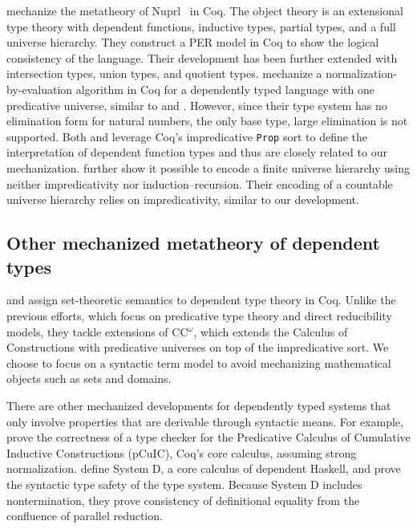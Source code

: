 \documentclass[\ifpublic nolinenum\else\fi,online,OA]{jfp}
\newcommand{\jc}[1]{}
\theoremstyle{definition}
\begin{document}
\citet{anand2014towards} mechanize the metatheory of
Nuprl~\citep{constable1986implementing} in Coq. The object theory is an
extensional type theory with dependent functions, inductive types,
partial types, and a full universe hierarchy. They construct a PER
model in Coq to show the logical consistency of the language. Their
development has been further extended with intersection types,
union types, and quotient types.
\citet{nbeincoq} mechanize a normalization-by-evaluation algorithm in Coq for a
dependently typed language with one predicative universe, similar to
\citet{decagda} and \citet{martin-lof-a-la-coq}. However, since their
type system has no elimination form for natural numbers, the only base type,
large elimination is not supported.
Both \citet{anand2014towards} and \citet{nbeincoq} leverage
Coq's impredicative \texttt{Prop} sort to define the interpretation
of dependent function types and thus are closely related to our
mechanization. \citet{anand2014towards} further show it possible
to encode a finite universe hierarchy using neither impredicativity
nor induction--recursion. Their encoding of a countable
universe hierarchy relies on impredicativity, similar to our
development.
\jc{Wait I'm confused, do they use impredicativity or not?}

\subsection{Other mechanized metatheory of dependent types}

 and \citet{Wang2013SemanticsOI} assign
set-theoretic semantics to dependent type theory in Coq. Unlike the
previous efforts, which focus on predicative type theory and direct
reducibility models, they tackle extensions of
CC$^\omega$, which extends the Calculus of Constructions with predicative
universes on top of the impredicative sort. We choose to
focus on a syntactic term model to avoid mechanizing mathematical objects
such as sets and domains.

There are other mechanized developments for dependently typed systems that
only involve properties that are derivable through syntactic means. For
example, \citet{coqcoqcorrect2019} prove the correctness of a type checker
for the Predicative Calculus of Cumulative Inductive Constructions (pCuIC),
Coq's core calculus, assuming strong normalization.
\citet{weirich:systemd} define System D, a core calculus of
dependent Haskell, and prove the syntactic type safety of the type
system. Because System D includes nontermination, they prove
consistency of definitional equality from the confluence of 
parallel reduction.
\jc{Why specifically mention System D? Surely there are other more notable
(in reviewers' eyes) dependent languages for which type safety have been proven?}
\end{document}

